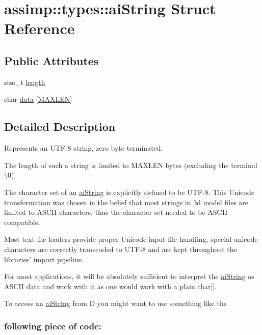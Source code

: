 \hypertarget{structassimp_1_1types_1_1ai_string}{\section{assimp\+:\+:types\+:\+:ai\+String Struct Reference}
\label{structassimp_1_1types_1_1ai_string}
}
\subsection*{Public Attributes}
\begin{DoxyCompactItemize}
\item 
size\+\_\+t \hyperlink{structassimp_1_1types_1_1ai_string_ae92dc7402798c16a0543f9a9fc7ea2ac}{length}
\item 
char \hyperlink{structassimp_1_1types_1_1ai_string_afe06048e3e72c3b60edb4810c145d2da}{data} \mbox{[}\hyperlink{namespaceassimp_1_1types_a43a64bf6b45fdc2376b2d8baa2b275f4}{M\+A\+X\+L\+E\+N}\mbox{]}
\end{DoxyCompactItemize}


\subsection{Detailed Description}
Represents an U\+T\+F-\/8 string, zero byte terminated.

The length of such a string is limited to {\ttfamily M\+A\+X\+L\+E\+N} bytes (excluding the terminal \textbackslash{}0).

The character set of an \hyperlink{structassimp_1_1types_1_1ai_string}{ai\+String} is explicitly defined to be U\+T\+F-\/8. This Unicode transformation was chosen in the belief that most strings in 3d model files are limited to A\+S\+C\+I\+I characters, thus the character set needed to be A\+S\+C\+I\+I compatible.

Most text file loaders provide proper Unicode input file handling, special unicode characters are correctly transcoded to U\+T\+F-\/8 and are kept throughout the libraries' import pipeline.

For most applications, it will be absolutely sufficient to interpret the \hyperlink{structassimp_1_1types_1_1ai_string}{ai\+String} as A\+S\+C\+I\+I data and work with it as one would work with a plain char\mbox{[}\mbox{]}.

To access an \hyperlink{structassimp_1_1types_1_1ai_string}{ai\+String} from D you might want to use something like the \subsubsection*{following piece of code\+: }

